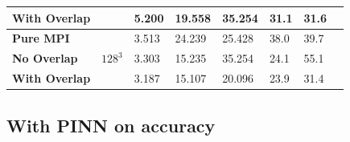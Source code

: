 \begin{frame}
\begin{center}
\begin{tabular}{p{2.5cm} p{1cm} p{1.5cm} p{1.5cm} p{1.5cm} p{1.5cm} p{1cm} p{1cm}}
          \bfseries With Overlap  &                               & 5.200  & 19.558              &  35.254                    & 31.1 & 31.6 \\
          \midrule
          \bfseries Pure MPI      & \multirow{3}{*}{$128^3$}      & 3.513  & 24.239              &  25.428                    & 38.0 & 39.7 \\
          \bfseries No Overlap    &                               & 3.303  & 15.235              &  35.254                    & 24.1 & 55.1 \\
          \bfseries With Overlap  &                               & 3.187  & 15.107              &  20.096                    & 23.9 & 31.4 \\
          \bottomrule
        \end{tabular}
      \end{center}
  

\end{frame}






\subsection{With PINN on accuracy}


